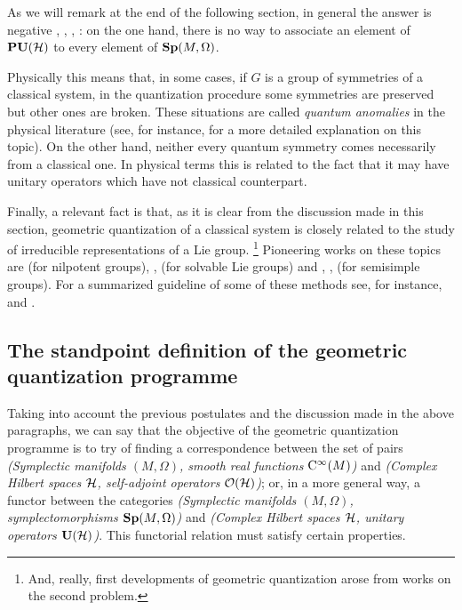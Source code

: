 \documentclass[12pt]{article}
\theoremstyle{plain}
\def\H{{\cal H}}
\def\Cinfty{{\rm C}^\infty}
\begin{document}
As we will remark at the end of the following section, in general the
answer is negative
\cite{AM-78}, \cite{Go-80}, \cite{Gr-46}, \cite{Vh-51}:
on the one hand, there is no way to associate
an element of ${\bf PU}(\H )$ to every element of ${\bf Sp}(M,\Omega )$.

Physically this means that, in some cases,
if $G$ is a group of symmetries of a classical system,
in the quantization procedure some symmetries are preserved
but other ones are broken. These situations are called
{\it quantum anomalies} in the physical literature
(see, for instance, \cite{GS-dggt} for a more detailed explanation on
this topic).
On the other hand, neither every quantum symmetry
comes necessarily from a classical one.
In physical terms this is related to the fact that it may have
unitary operators which have not classical counterpart.

Finally, a relevant fact is that, as it is clear from the discussion
made in this section,
geometric quantization of a classical system is closely related to the
study of irreducible
representations of a Lie group.%
\footnote{
And, really, first developments of geometric quantization
arose from works on the second problem.}
Pioneering works on these topics are \cite{Ki-62} (for nilpotent
groups),
\cite{AK-71}, \cite{Be-rglr} (for solvable Lie groups)
and \cite{Bl-73}, \cite{Bl-77}, \cite{RW-rsg} (for semisimple groups).
For a summarized guideline of some of these methods see,
for instance, \cite{Ki-gq} and \cite{Wn-77}.



\subsection{The standpoint definition of the
            geometric quantization programme}



Taking into account the previous postulates and the discussion
made in the above paragraphs, we can say that
the objective of the geometric quantization programme
is to try of finding a correspondence between the set of pairs
{\it (Symplectic manifolds $(M,\Omega )$,  smooth real functions
$\Cinfty (M)$)}
and {\it (Complex Hilbert spaces $\H$, self-adjoint operators ${\cal
O}(\H )$)};
or, in a more general way, a functor between the categories
{\it (Symplectic manifolds $(M,\Omega )$, symplectomorphisms ${\bf
Sp}(M,\Omega )$)}
and {\it (Complex Hilbert spaces $\H$, unitary operators ${\bf U}(\H
)$)}.
This functorial relation must satisfy certain properties.
\end{document}
